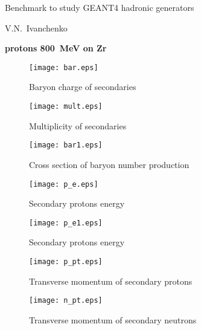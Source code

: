 \documentclass[12pt]{article}
\begin{document}
\pagestyle{empty}

\begin{center}
{\large Benchmark to study GEANT4 hadronic generators} 

\vspace*{5mm}
V.N.~Ivanchenko

\vspace*{5mm}


\vspace*{5mm}

{\bf protons 800~MeV on Zr} 

\vspace*{5mm}


\end{center}


\begin{figure}[htbp]
\caption{Baryon charge of secondaries}
\label{fig1}  
\centerline{\texttt{[image: bar.eps]}}
\end{figure}
\begin{figure}[htbp]
\caption{Multiplicity of secondaries}
\label{fig1a}  
\centerline{\texttt{[image: mult.eps]}}
\end{figure}
\begin{figure}[htbp]
\caption{Cross section of baryon number production}
\label{fig1b}  
\centerline{\texttt{[image: bar1.eps]}}
\end{figure}

\begin{figure}[htbp]
\caption{Secondary protons energy}
\label{fig2} 
\centerline{\texttt{[image: p\_e.eps]}}
\end{figure}
\begin{figure}[htbp]
\caption{Secondary protons energy}
\label{fig2a} 
\centerline{\texttt{[image: p\_e1.eps]}}
\end{figure}

\newpage

\begin{figure}[htbp]
\caption{Transverse momentum of secondary protons} 
\label{fig3}
\centerline{\texttt{[image: p\_pt.eps]}}
\end{figure}

\newpage

\begin{figure}[htbp]
\caption{Transverse momentum of secondary neutrons} 
\label{fig4}
\centerline{\texttt{[image: n\_pt.eps]}}
\end{figure}
\end{document}
